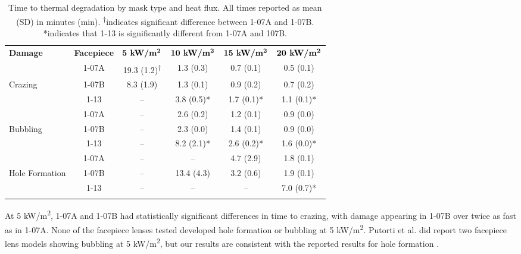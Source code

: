 \documentclass[sn-mathphys]{sn-jnl}%
\theoremstyle{thmstyleone}%
\theoremstyle{thmstyletwo}%
\theoremstyle{thmstylethree}%
\begin{document}
\begin{table}[h!]
\begin{center}

\caption{Time to thermal degradation by mask type and heat flux. All times reported as mean (SD) in minutes (min). \textsuperscript{†}indicates significant difference between 1-07A and 1-07B. *indicates that 1-13 is significantly different from 1-07A and 107B.}\label{tab2}

    \begin{tabular}{lccccc}
      \toprule
      \textbf{Damage} & \textbf{Facepiece} & $\textbf{5 kW/m\textsuperscript{2}}$ & $\textbf{10 kW/m\textsuperscript{2}}$ & $\textbf{15 kW/m\textsuperscript{2}}$& $\textbf{20 kW/m\textsuperscript{2}}$\\
      \botrule
      & 1-07A & 19.3 (1.2)\textsuperscript{†} & 1.3 (0.3) & 0.7 (0.1) & 0.5 (0.1)\\ 
      \cmidrule{2-6}
      Crazing & 1-07B & 8.3 (1.9) & 1.3 (0.1) & 0.9 (0.2) & 0.7 (0.2)\\ 
      \cmidrule{2-6}
      & 1-13 & -- & 3.8 (0.5)* & 1.7 (0.1)* & 1.1 (0.1)*\\ 
      \botrule

        & 1-07A & -- & 2.6 (0.2) & 1.2 (0.1) & 0.9 (0.0)\\ 
      \cmidrule{2-6}
      Bubbling & 1-07B & -- & 2.3 (0.0) & 1.4 (0.1) & 0.9 (0.0)\\ 
      \cmidrule{2-6}
      & 1-13 & -- & 8.2 (2.1)* & 2.6 (0.2)* & 1.6 (0.0)*\\ 
      \botrule

        & 1-07A & -- & -- & 4.7 (2.9) & 1.8 (0.1)\\ 
      \cmidrule{2-6}
      Hole Formation & 1-07B & -- & 13.4 (4.3) & 3.2 (0.6) & 1.9 (0.1)\\ 
      \cmidrule{2-6}
      & 1-13 & -- & -- & -- & 7.0 (0.7)*\\ 
      \botrule
     
    \end{tabular}
  
  \end{center}
\end{table}

At 5 kW/m\textsuperscript{2}, 1-07A and 1-07B had statistically significant differences in time to crazing, with damage appearing in 1-07B over twice as fast as in 1-07A. None of the facepiece lenses tested developed hole formation or bubbling at 5 kW/m\textsuperscript{2}. Putorti et al. did report two facepiece lens models showing bubbling at 5 kW/m\textsuperscript{2}, but our results are consistent with the reported results for hole formation \cite{putorti_thermal_2013}. 
\end{document}
